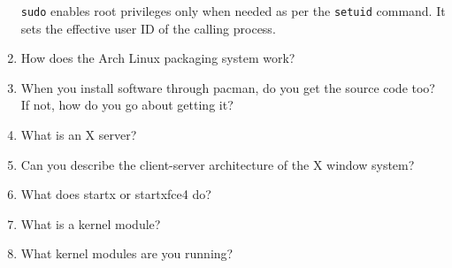 \documentclass[]{article}
\newcommand{\code}{\texttt}
\begin{document}
\begin{enumerate}
\code{sudo} enables root privileges only when needed as per the \code{setuid}
command. It sets the effective user ID of the calling process.

\item How does the Arch Linux packaging system work?
\item When you install software through pacman, do you get the source code too?
If not, how do you go about getting it?
\item What is an X server?
\item Can you describe the client-server architecture of the X window system?
\item What does startx or startxfce4 do?
\item What is a kernel module?
\item What kernel modules are you running?
\end{enumerate}
\end{document}
